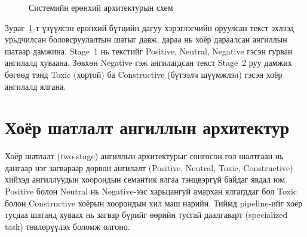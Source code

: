 \begin{figure}[H]
  \centering
  \caption{Системийн ерөнхий архитектурын схем}
  \label{fig:system-arch}
\end{figure}

Зураг~\ref{fig:system-arch}-т үзүүлсэн ерөнхий бүтцийн дагуу хэрэглэгчийн
оруулсан текст эхлээд урьдчилсан боловсруулалтын шатыг давж, дараа нь хоёр
дараалсан ангиллын шатаар дамжина. Stage~1 нь текстийг Positive, Neutral,
Negative гэсэн гурван ангилалд хуваана. Зөвхөн Negative гэж ангилагдсан
текст Stage~2 руу дамжих бөгөөд тэнд Toxic (хортой) ба Constructive
(бүтээлч шүүмжлэл) гэсэн хоёр ангилалд ялгана.

\section{Хоёр шатлалт ангиллын архитектур}

Хоёр шатлалт (two-stage) ангиллын архитектурыг сонгосон гол шалтгаан нь дангаар
нэг загвараар дөрвөн ангилалт (Positive, Neutral, Toxic, Constructive) хийхэд
ангиллуудын хоорондын семантик ялгаа тэнцвэргүй байдаг явдал юм. Positive болон
Neutral нь Negative-ээс харьцангуй амархан ялгагддаг бол Toxic болон
Constructive хоёрын хоорондын хил маш нарийн. Тиймд pipeline-ийг хоёр
тусдаа шатанд хуваах нь загвар бүрийг өөрийн тусгай даалгаварт
(specialized task) төвлөрүүлэх боломж олгоно.

